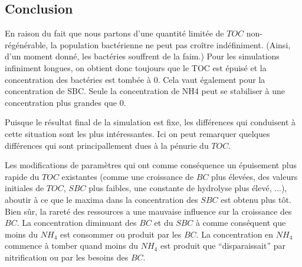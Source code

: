 \subsection{Conclusion}
\par{
En raison du fait que nous partons d'une quantité limitée de $TOC$ non-régénérable, la population bactérienne
ne peut pas croître indéfiniment. (Ainsi, d'un moment donné, les bactéries souffrent de la faim.)
Pour les simulations infiniment longues, on obtient donc toujours que le TOC est épuisé et la
concentration des bactéries est tombée à $0$. Cela vaut également pour la concentration de SBC.
Seule la concentration de NH4 peut se stabiliser à une concentration plus grandes que $0$.
}
\par{
Puisque le résultat final de la simulation est fixe, les différences qui conduisent à cette situation
sont les plus intéressantes. Ici on peut remarquer quelques différences qui sont principallement dues à
la pénurie du $TOC$.
}
\par{
Les modifications de paramètres qui ont comme conséquence un épuisement plus rapide du $TOC$ existantes
(comme une croissance de $BC$ plus élevées, des valeurs initiales de $TOC$, $SBC$ plus faibles, une
constante de hydrolyse plus élevé, ...), aboutir à ce que le maxima dans la concentration des $SBC$
est obtenu plus tôt. Bien sûr, la rareté des ressources a une mauvaise influence sur la croissance des $BC$.
La concentration diminuant des $BC$ et du $SBC$ à comme conséquent que moins du $NH_4$ est consommer ou
produit par les $BC$. La concentration en $NH_4$ commence à tomber quand moins du $NH_4$ est produit que
``disparaissait'' par nitrification ou par les besoins des $BC$.
}
